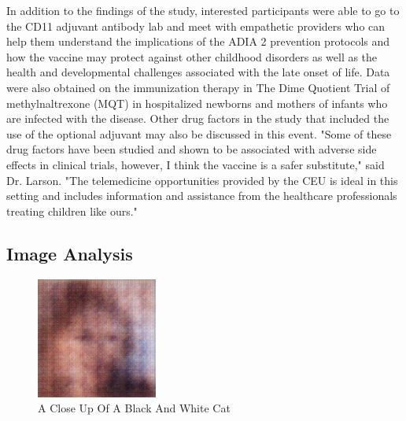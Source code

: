 \documentclass{article}%
\begin{document}
In addition to the findings of the study, interested participants were able to go to the CD11 adjuvant antibody lab and meet with empathetic providers who can help them understand the implications of the ADIA 2 prevention protocols and how the vaccine may protect against other childhood disorders as well as the health and developmental challenges associated with the late onset of life. Data were also obtained on the immunization therapy in The Dime Quotient Trial of methylnaltrexone (MQT) in hospitalized newborns and mothers of infants who are infected with the disease.\newline%
Other drug factors in the study that included the use of the optional adjuvant may also be discussed in this event.\newline%
"Some of these drug factors have been studied and shown to be associated with adverse side effects in clinical trials, however, I think the vaccine is a safer substitute," said Dr. Larson. "The telemedicine opportunities provided by the CEU is ideal in this setting and includes information and assistance from the healthcare professionals treating children like ours."

%
\subsection{Image Analysis}%
\label{subsec:ImageAnalysis}%


\begin{figure}[h!]%
\centering%
\includegraphics[width=150px]{500_fake_images/samples_5_158.png}%
\caption{A Close Up Of A Black And White Cat}%
\end{figure}

%
\end{document}
